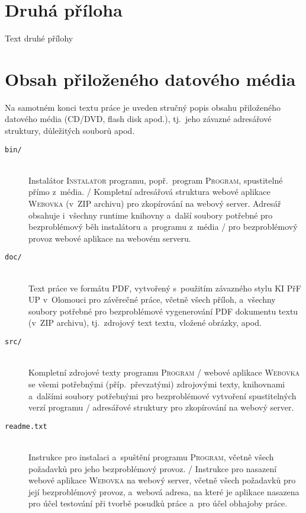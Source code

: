 \documentclass[
  biblatex,
  figures=false,
  glossaries,
  index
]{kidiplom}
\begin{document}
\section{Druhá příloha}
Text druhé přílohy

\section{Obsah přiloženého datového média} \label{sec:ObsahMedia}

Na samotném konci textu práce je uveden stručný popis obsahu
přiloženého datového média (CD/DVD, flash disk apod.), tj.~jeho závazné adresářové struktury, důležitých
souborů apod.

\begin{description}

\item[\texttt{bin/}] \hfill \\
  Instalátor \textsc{Instalator} programu, popř.~program
  \textsc{Program}, spustitelné přímo z~média. / Kompletní adresářová
  struktura webové aplikace \textsc{Webovka} (v~ZIP archivu) pro
  zkopírování na webový server. Adresář obsahuje i~všechny runtime
  knihovny a~další soubory potřebné pro bezproblémový běh instalátoru
  a~programu z~média / pro bezproblémový provoz webové aplikace na
  webovém serveru.

\item[\texttt{doc/}] \hfill \\
  Text práce ve formátu PDF, vytvořený s~použitím závazného stylu KI
  PřF UP v~Olomouci pro závěrečné práce, včetně všech příloh,
  a~všechny soubory potřebné pro bezproblémové vygenerování PDF
  dokumentu textu (v~ZIP archivu), tj.~zdrojový text textu, vložené
  obrázky, apod.

\item[\texttt{src/}] \hfill \\
  Kompletní zdrojové texty programu \textsc{Program} / webové aplikace
  \textsc{Webovka} se všemi potřebnými (příp.~převzatými) zdrojovými
  texty, knihovnami a~dalšími soubory potřebnými pro bezproblémové
  vytvoření spustitelných verzí programu / adresářové struktury pro
  zkopírování na webový server.

\item[\texttt{readme.txt}] \hfill \\
  Instrukce pro instalaci a~spuštění programu \textsc{Program}, včetně
  všech požadavků pro jeho bezproblémový provoz. / Instrukce pro
  nasazení webové aplikace \textsc{Webovka} na webový server, včetně
  všech požadavků pro její bezproblémový provoz, a~webová adresa, na
  které je aplikace nasazena pro účel testování při tvorbě posudků
  práce a~pro účel obhajoby práce.

\end{description}
\end{document}
